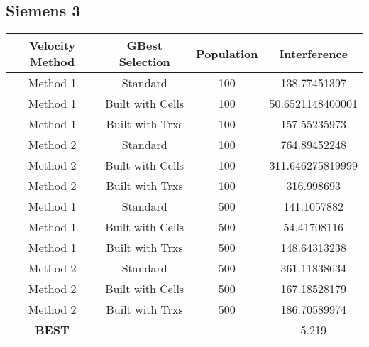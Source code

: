 \subsection{Siemens 3}
\begin{center}
	\begin{tabular}{| c | c | c | c |}
	\hline
	Velocity Method & GBest Selection & Population & Interference\\ \hline
	Method 1 & Standard & 100 & 138.77451397\\ \hline
	Method 1 & Built with Cells & 100 & 50.6521148400001\\ \hline
	Method 1 & Built with Trxs & 100 & 157.55235973\\ \hline
	Method 2 & Standard & 100 & 764.89452248\\ \hline
	Method 2 & Built with Cells & 100 & 311.646275819999\\ \hline
	Method 2 & Built with Trxs & 100 & 316.998693\\ \hline
	Method 1 & Standard & 500 & 141.1057882\\ \hline
	Method 1 & Built with Cells & 500 & 54.41708116\\ \hline
	Method 1 & Built with Trxs & 500 & 148.64313238\\ \hline
	Method 2 & Standard & 500 & 361.11838634\\ \hline
	Method 2 & Built with Cells & 500 & 167.18528179\\ \hline
	Method 2 & Built with Trxs & 500 & 186.70589974\\ \hline
	\textbf{BEST} & --- & --- & 5.219 \\ \hline
	\end{tabular}
\end{center}
